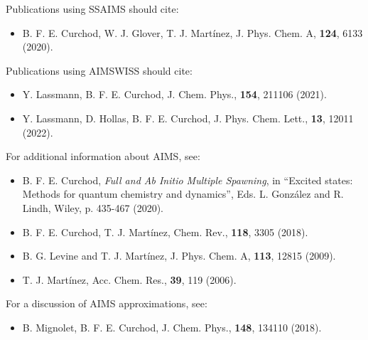 \documentclass[11pt]{article}
\begin{document}
\noindent Publications using SSAIMS should cite:
\begin{itemize}
\item B. F. E. Curchod, W. J. Glover, T. J. Mart\'{i}nez, J. Phys. Chem. A, \textbf{124}, 6133 (2020).
\end{itemize}

\noindent Publications using AIMSWISS should cite:
\begin{itemize}
\item Y. Lassmann, B. F. E. Curchod, J. Chem. Phys., \textbf{154}, 211106 (2021).
\item Y. Lassmann, D. Hollas, B. F. E. Curchod, J. Phys. Chem. Lett., \textbf{13}, 12011 (2022).
\end{itemize}



\noindent For additional information about AIMS, see:
\begin{itemize}
\item B. F. E. Curchod, \textit{Full and Ab Initio Multiple Spawning}, in ``Excited states: Methods for quantum chemistry and dynamics'', Eds. L. Gonz\'{a}lez and R. Lindh, Wiley, p. 435-467 (2020). 
\item B. F. E. Curchod, T. J. Mart\'{i}nez, Chem. Rev., \textbf{118}, 3305 (2018).
\item B. G. Levine and T. J. Mart\'{i}nez, J. Phys. Chem. A, \textbf{113}, 12815 (2009).
\item T. J. Mart\'{i}nez, Acc. Chem. Res., \textbf{39}, 119 (2006).
\end{itemize}

\noindent For a discussion of AIMS approximations, see:
\begin{itemize}
\item B. Mignolet, B. F. E. Curchod, J. Chem. Phys., \textbf{148}, 134110 (2018).
\end{itemize}
\end{document}
